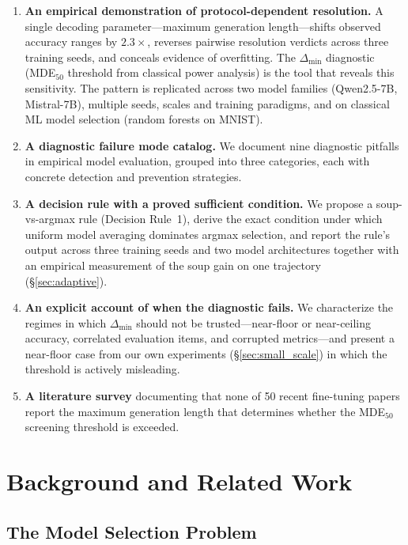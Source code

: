 \documentclass[pdflatex,sn-mathphys-ay,oneside]{sn-jnl}
\theoremstyle{thmstylethree}
\begin{document}
\begin{enumerate}
    \item \textbf{An empirical demonstration of protocol-dependent resolution.} A single decoding parameter---maximum generation length---shifts observed accuracy ranges by $2.3\times$, reverses pairwise resolution verdicts across three training seeds, and conceals evidence of overfitting. The $\Delta_{\min}$ diagnostic (MDE$_{50}$ threshold from classical power analysis) is the tool that reveals this sensitivity. The pattern is replicated across two model families (Qwen2.5-7B, Mistral-7B), multiple seeds, scales and training paradigms, and on classical ML model selection (random forests on MNIST).
    \item \textbf{A diagnostic failure mode catalog.} We document nine diagnostic pitfalls in empirical model evaluation, grouped into three categories, each with concrete detection and prevention strategies.
    \item \textbf{A decision rule with a proved sufficient condition.} We propose a soup-vs-argmax rule (Decision Rule~1), derive the exact condition under which uniform model averaging dominates argmax selection, and report the rule's output across three training seeds and two model architectures together with an empirical measurement of the soup gain on one trajectory (\S\ref{sec:adaptive}).
    \item \textbf{An explicit account of when the diagnostic fails.} We characterize the regimes in which $\Delta_{\min}$ should not be trusted---near-floor or near-ceiling accuracy, correlated evaluation items, and corrupted metrics---and present a near-floor case from our own experiments (\S\ref{sec:small_scale}) in which the threshold is actively misleading.
    \item \textbf{A literature survey} documenting that none of 50 recent fine-tuning papers report the maximum generation length that determines whether the MDE$_{50}$ screening threshold is exceeded.
\end{enumerate}

\section{Background and Related Work}\label{sec:background}

\subsection{The Model Selection Problem}
\end{document}
